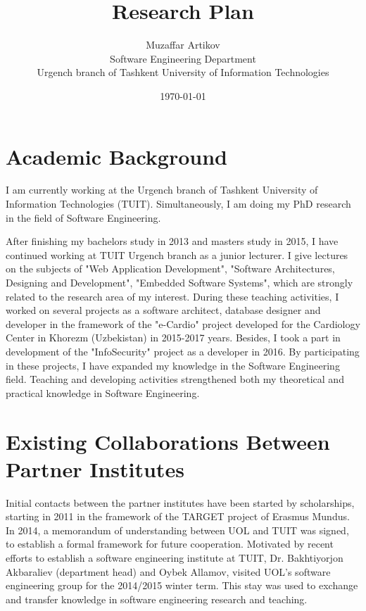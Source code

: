 \documentclass[10pt, oneside]{article}
\title{Research Plan}
\author{Muzaffar Artikov\\
Software Engineering Department\\
Urgench branch of Tashkent University of Information Technologies}
\date{\today}
\begin{document}
\maketitle

\section{Academic Background}
I am currently working at the Urgench branch of Tashkent University of Information Technologies (TUIT). Simultaneously, I am doing my PhD research in the field of Software Engineering. 

After finishing my bachelors study in 2013 and masters study in 2015, I have continued working at TUIT Urgench branch as a junior lecturer. I give lectures on the subjects of "Web Application Development", "Software Architectures, Designing and Development", "Embedded Software Systems", which are strongly related to the research area of my interest. During these teaching activities, I worked on several projects as a software architect, database designer and developer in the framework of the "e-Cardio" project developed for the Cardiology Center in Khorezm (Uzbekistan) in 2015-2017 years. Besides, I took a part in development of the "InfoSecurity" project as a developer in 2016. By participating in these projects, I have expanded my knowledge in the Software Engineering field. Teaching and developing activities strengthened both my theoretical and practical knowledge in Software Engineering.

\section{Existing Collaborations Between Partner Institutes}
Initial contacts between the partner institutes have been started by scholarships, starting in 2011 in the framework of the TARGET project of Erasmus Mundus. In 2014, a memorandum of understanding between UOL and TUIT was signed, to establish a formal framework for future cooperation. Motivated by recent efforts to establish a software engineering institute at TUIT, Dr. Bakhtiyorjon Akbaraliev (department head) and Oybek Allamov, visited UOL’s software engineering group for the 2014/2015 winter term. This stay was used to exchange and transfer knowledge in software engineering research and teaching.
\end{document}
